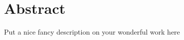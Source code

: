 \documentclass[class=report,11pt,crop=false]{standalone}
\begin{document}
\chapter*{Abstract}

Put a nice fancy description on your wonderful work here
\end{document}
